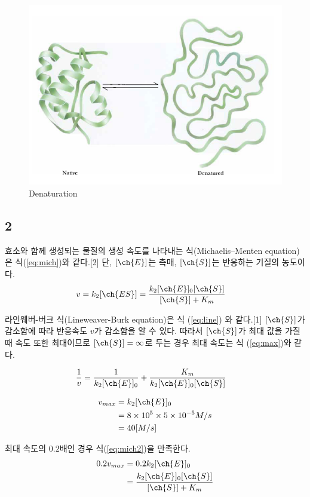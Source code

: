 \documentclass[%
 reprint,
 amsmath,amssymb,
 aps,
]{revtex4-2}
\begin{document}
\begin{figure}[htbp]
	\includegraphics[width = 0.6\linewidth]{denaturation.png}%
	\caption{\label{fig:denaturation}Denaturation}
\end{figure}

\subsection{\label{sec:level2} 2}
효소와 함께 생성되는 물질의 생성 속도를 나타내는 식(Michaelis–Menten equation)은 식(\ref{eq:mich})와 같다.[2] 단, $[\ch{E}]$는 촉매, $[\ch{S}]$는 반응하는 기질의 농도이다.
\begin{align}
	v &= k_{2}[\ch{ES}] = \frac{k_{2}[\ch{E}]_{0}[\ch{S}]}{[\ch{S}] + K_{m}}\label{eq:mich}
\end{align}

라인웨버-버크 식(Lineweaver-Burk equation)은 식 (\ref{eq:line}) 와 같다.[1] $[\ch{S}]$가 감소함에 따라 반응속도 $v$가 감소함을 알 수 있다. 따라서 $[\ch{S}]$가 최대 값을 가질 때 속도 또한 최대이므로 $[\ch{S}] = \infty$로 두는 경우 최대 속도는 식 (\ref{eq:max})와 같다.

\begin{align}
	\frac{1}{v} &= \frac{1}{k_{2}[\ch{E}]_{0}} + \frac{K_{m}}{k_{2}[\ch{E}]_{0}[\ch{S}]}\label{eq:line}
\end{align}

\begin{align}
	v_{max} &= k_{2}[\ch{E}]_{0} \label{eq:max}\\
	&= 8\times 10^{5}\times 5 \times 10^{-5}M/s\\
	&= 40 [M/s]
\end{align}

최대 속도의 $0.2$배인 경우 식(\ref{eq:mich2})을 만족한다.
\begin{align}
	\begin{split}
		0.2v_{max} &= 0.2 k_{2}[\ch{E}]_{0}\\
		&=\frac{k_{2}[\ch{E}]_{0}[\ch{S}]}{[\ch{S}] + K_{m}}\label{eq:mich2}
	\end{split}
\end{align}
\end{document}
